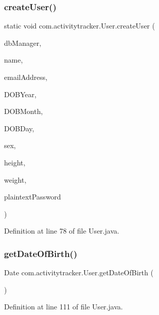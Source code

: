 \subsubsection{\texorpdfstring{create\+User()}{createUser()}}
{\footnotesize\ttfamily static void com.\+activitytracker.\+User.\+create\+User (\begin{DoxyParamCaption}\item[{final \mbox{\hyperlink{classcom_1_1activitytracker_1_1_d_b_manager}{D\+B\+Manager}}}]{db\+Manager,  }\item[{final String}]{name,  }\item[{final String}]{email\+Address,  }\item[{final int}]{D\+O\+B\+Year,  }\item[{final int}]{D\+O\+B\+Month,  }\item[{final int}]{D\+O\+B\+Day,  }\item[{final User.\+Sex}]{sex,  }\item[{final float}]{height,  }\item[{final float}]{weight,  }\item[{final String}]{plaintext\+Password }\end{DoxyParamCaption})\hspace{0.3cm}{\ttfamily [static]}}



Definition at line 78 of file User.\+java.

\mbox{\label{classcom_1_1activitytracker_1_1_user_a40da04454cea10bb5c6e6125a7a9cf64}} 
\subsubsection{\texorpdfstring{get\+Date\+Of\+Birth()}{getDateOfBirth()}}
{\footnotesize\ttfamily Date com.\+activitytracker.\+User.\+get\+Date\+Of\+Birth (\begin{DoxyParamCaption}{ }\end{DoxyParamCaption})}



Definition at line 111 of file User.\+java.

\mbox{\label{classcom_1_1activitytracker_1_1_user_a79d69ca90216e0552ac4cae9778ea40d}} 
